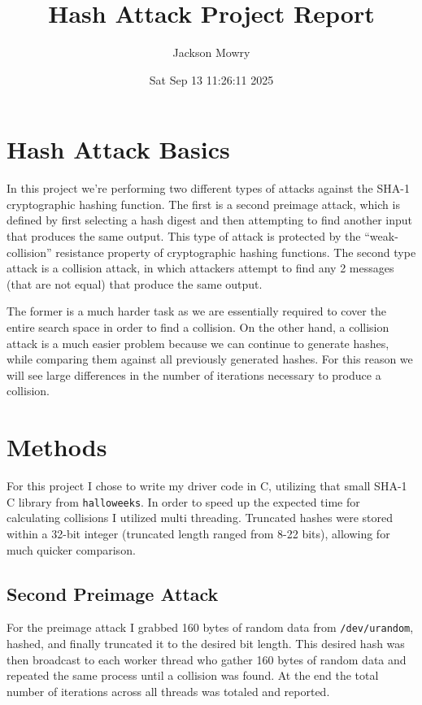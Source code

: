 \documentclass[11pt]{article}
\author{Jackson Mowry}
\date{Sat Sep 13 11:26:11 2025}
\title{Hash Attack Project Report}
\begin{document}
\maketitle
\section*{Hash Attack Basics}
\label{sec:org6702e67}
In this project we're performing two different types of attacks against the SHA-1 cryptographic hashing function. The first is a second preimage attack, which is defined by first selecting a hash digest and then attempting to find another input that produces the same output. This type of attack is protected by the ``weak-collision'' resistance property of cryptographic hashing functions. The second type attack is a collision attack, in which attackers attempt to find any 2 messages (that are not equal) that produce the same output.

The former is a much harder task as we are essentially required to cover the entire search space in order to find a collision. On the other hand, a collision attack is a much easier problem because we can continue to generate hashes, while comparing them against all previously generated hashes. For this reason we will see large differences in the number of iterations necessary to produce a collision.
\section*{Methods}
\label{sec:org39cccf1}
For this project I chose to write my driver code in C, utilizing that small SHA-1 C library from \texttt{halloweeks}. In order to speed up the expected time for calculating collisions I utilized multi threading. Truncated hashes were stored within a 32-bit integer (truncated length ranged from 8-22 bits), allowing for much quicker comparison.
\subsection*{Second Preimage Attack}
\label{sec:orgb4598ff}
For the preimage attack I grabbed 160 bytes of random data from \texttt{/dev/urandom}, hashed, and finally truncated it to the desired bit length. This desired hash was then broadcast to each worker thread who gather 160 bytes of random data and repeated the same process until a collision was found. At the end the total number of iterations across all threads was totaled and reported.
\end{document}
